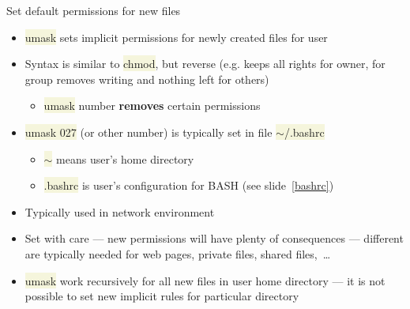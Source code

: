 \documentclass[compress, ucs, xelatex, 11pt, xcolor=svgnames, aspectratio=169,
	hyperref={
		bookmarks=true,
		unicode=true,
		colorlinks=true,
		pdftitle={Linux, command line and MetaCentrum},
		plainpages=false,
		pdfauthor={Vojtech Zeisek},
		pdfsubject={Course about use of Linux command line, writing shell scripts and using MetaCentrum of CESNET},
		pdfcreator={XeLaTeX},
		pdfkeywords={Linux, GNU, BASH, shell, command line, MetaCentrum},
		linkcolor=DarkRed, %
		anchorcolor=DarkBlue, %
		citecolor=Indigo, %
		filecolor=NavyBlue, %
		menucolor=DarkMagenta, %
		urlcolor=DarkBlue, %
		pdftex},
	url={hyphens, lowtilde} %
	]{beamer}
\renewcommand{\texttt}[1]{\colorbox{Beige}{{\ttfamily #1}}}
\begin{document}
\begin{frame}{Set default permissions for new files}
	\begin{itemize}
		\item \texttt{umask} sets implicit permissions for newly created files for user
		\item Syntax is similar to \texttt{chmod}, but reverse (e.g. \texttt{027} keeps all rights for owner, for group removes writing and nothing left for others)
		\begin{itemize}
			\item \texttt{umask} number \textbf{removes} certain permissions
		\end{itemize}
		\item \texttt{umask 027} (or other number) is typically set in file \texttt{$\sim$/.bashrc}
		\begin{itemize}
			\item \texttt{$\sim$} means user's home directory
			\item \texttt{.bashrc} is user's configuration for BASH (see slide~\ref{bashrc})
		\end{itemize}
		\item Typically used in network environment
		\item Set with care --- new permissions will have plenty of consequences --- different are typically needed for web pages, private files, shared files,~\ldots
		\item \texttt{umask} work recursively for all new files in user home directory --- it is not possible to set new implicit rules for particular directory
	\end{itemize}
\end{frame}
\end{document}

